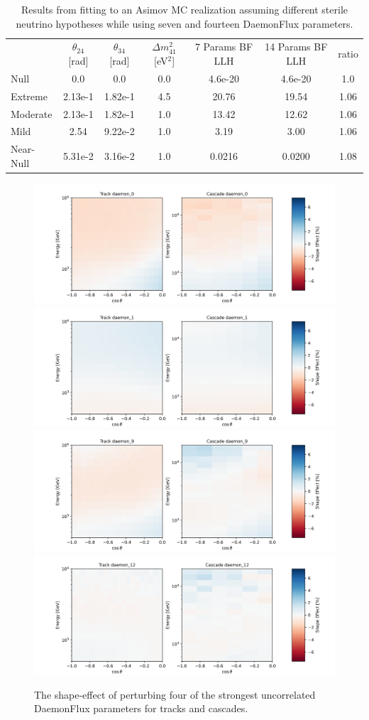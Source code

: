 \documentclass[main.tex]{subfiles}
\begin{document}
\begin{table}
    \centering
    \begin{tabular}{l|cccccc}\rowcolor{blue!25}
        & $\theta_{24}$ [rad] & $\theta_{34}$ [rad] & $\Delta m_{41}^{2}$ [eV$^{2}$]  & 7 Params BF LLH & 14 Params BF LLH & ratio \\
        Null    & 0.0 & 0.0 & 0.0 & 4.6e-20 & 4.6e-20 & 1.0  \\
        Extreme & 2.13e-1 & 1.82e-1 & 4.5 & 20.76 & 19.54 & 1.06 \\
        Moderate & 2.13e-1 & 1.82e-1 & 1.0 & 13.42 & 12.62 & 1.06 \\
        Mild & 2.54 & 9.22e-2 & 1.0 & 3.19 & 3.00 & 1.06 \\
        Near-Null & 5.31e-2 & 3.16e-2 & 1.0 & 0.0216 & 0.0200 & 1.08
    \end{tabular}
    \caption{Results from fitting to an Asimov MC realization assuming different sterile neutrino hypotheses while using seven and fourteen DaemonFlux parameters.}\label{tab:daemonfluxfit}
\end{table}

\begin{figure}
    \centering
    \includegraphics[width=0.45\linewidth]{figures/systematics/daemon_0.png}%
    \includegraphics[width=0.45\linewidth]{figures/systematics/daemon_1.png}\\
    \includegraphics[width=0.45\linewidth]{figures/systematics/daemon_9.png}%
    \includegraphics[width=0.45\linewidth]{figures/systematics/daemon_12.png}
    \caption{The shape-effect of perturbing four of the strongest uncorrelated DaemonFlux parameters for tracks and cascades.}\label{fig:daemon_analysis_one}
\end{figure}
\end{document}
